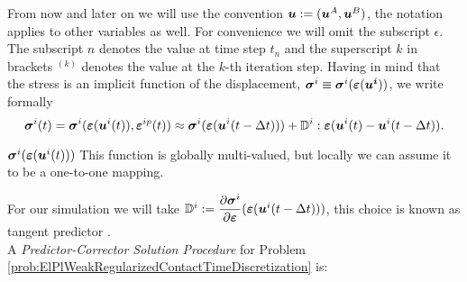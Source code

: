 \documentclass[12pt,a4paper]{scrbook}
\begin{document}
From now and later on we will use the convention $\mbox{\boldmath$u$}:=(\mbox{\boldmath$u$}^{A},\mbox{\boldmath$u$}^{B})$, the notation applies to other variables as well. For convenience we will omit the subscript $\epsilon$. The subscript $n$ denotes the value at time step $t_n$ and the superscript $k$ in brackets ${}^{(k)}$ denotes the value at the $k$-th iteration step.  Having in mind that the stress is an implicit function of the displacement, $\mbox{\boldmath$\sigma$}^{i}\equiv \mbox{\boldmath$\sigma$}^{i}(\mbox{\boldmath$\varepsilon$}(\mbox{\boldmath$\mbox{\boldmath$u$}^{i}$}))$, we write formally
\begin{equation}
\mbox{\boldmath$\sigma$}^{i}(t)=\mbox{\boldmath$\sigma$}^{i}(\mbox{\boldmath$\varepsilon$}(\mbox{\boldmath$u$}^{i}(t)),\mbox{\boldmath$\varepsilon$}^{ip}(t))\approx \mbox{\boldmath$\sigma$}^{i}(\mbox{\boldmath$\varepsilon$}(\mbox{\boldmath$u$}^{i}(t-\Delta t)))+ {\mathbb D}^{i}:\mbox{\boldmath$\varepsilon$}(\mbox{\boldmath$u$}^{i}(t)-\mbox{\boldmath$u$}^{i}(t-\Delta t)).
\end{equation}
\begin{remark}
$\mbox{\boldmath$\sigma$}^{i}(\mbox{\boldmath$\varepsilon$}(\mbox{\boldmath$u$}^{i}(t)))$ This function is globally multi-valued, but locally we can assume it to be a one-to-one mapping.
\end{remark}
For our simulation we will take ${\mathbb D}^{i}:=\dfrac{\partial\mbox{\boldmath$\sigma$}^{i}}{\partial \mbox{\boldmath$\varepsilon$}}(\mbox{\boldmath$\varepsilon$}(\mbox{\boldmath$u$}^{i}(t-\Delta t)))$, this choice is known as tangent predictor \cite{Bl97,WeRe99}.\\
A \textit{Predictor-Corrector Solution Procedure} for Problem \ref{prob:ElPlWeakRegularizedContactTimeDiscretization} is:
\end{document}
